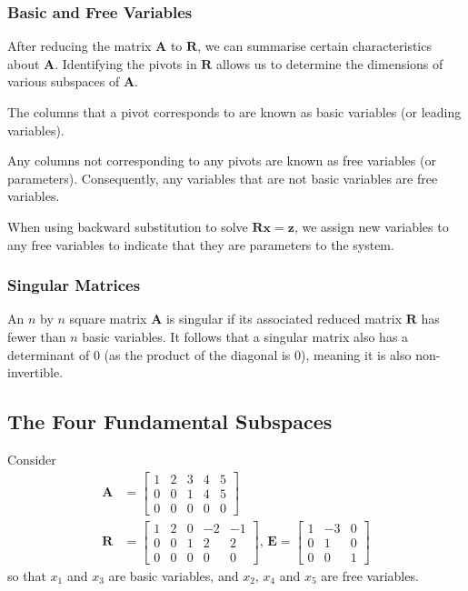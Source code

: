 \documentclass{article}
\begin{document}
\subsubsection{Basic and Free Variables}
After reducing the matrix \(\symbf{A}\) to \(\symbf{R}\), we can
summarise certain characteristics about \(\symbf{A}\). Identifying the
pivots in \(\symbf{R}\) allows us to determine the dimensions of
various subspaces of \(\symbf{A}\).
\begin{definition}
    The columns that a pivot corresponds to are known as basic variables (or leading variables).
\end{definition}
\begin{definition}
    Any columns not corresponding to any pivots are known as free variables (or parameters).
    Consequently, any variables that are not basic variables are free variables.
\end{definition}
When using backward substitution to solve \(\symbf{R} \symbf{x} = \symbf{z}\), we assign new variables
to any free variables to indicate that they are parameters to the system.
\subsubsection{Singular Matrices}
An \(n\) by \(n\) square matrix \(\symbf{A}\) is singular if its
associated reduced matrix \(\symbf{R}\) has fewer than \(n\) basic
variables. It follows that a singular matrix also has a determinant of
0 (as the product of the diagonal is 0), meaning it is also
non-invertible.
\subsection{The Four Fundamental Subspaces}
Consider
\begin{align*}
    \symbf{A} & =
    \begin{bmatrix}
        1 & 2 & 3 & 4 & 5 \\
        0 & 0 & 1 & 4 & 5 \\
        0 & 0 & 0 & 0 & 0
    \end{bmatrix}
    \\
    \symbf{R} & =
    \begin{bmatrix}
        1 & 2 & 0 & -2 & -1 \\
        0 & 0 & 1 & 2  & 2  \\
        0 & 0 & 0 & 0  & 0
    \end{bmatrix}
    , \,
    \symbf{E} =
    \begin{bmatrix}
        1 & -3 & 0 \\
        0 & 1  & 0 \\
        0 & 0  & 1
    \end{bmatrix}
\end{align*}
so that \(x_1\) and \(x_3\) are basic variables, and \(x_2\), \(x_4\) and \(x_5\) are free variables.
\end{document}
